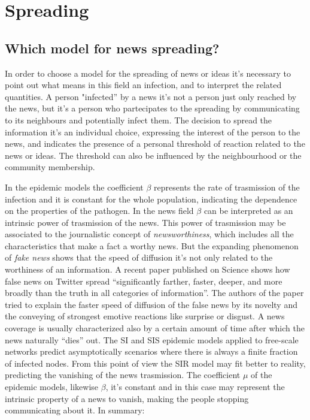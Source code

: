 \chapter{Spreading} %
\label{cha:spreading}

\section{Which model for news spreading?}

In order to choose a model for the spreading of news or ideas it's necessary to point out
what means in this field an infection, and to interpret the related quantities.
A person "infected'' by a news it's not a person just only reached by the news, but it's a person
who partecipates to the spreading by communicating to its neighbours and potentially infect them.
The decision to spread the information it's an individual choice, expressing the interest
of the person to the news, and indicates the presence of a personal threshold of reaction related to the news or ideas.
The threshold can also be influenced by the neighbourhood or the community membership.


In the epidemic models the coefficient $\beta$ represents the rate of trasmission of the infection and it is constant for the whole population, indicating the dependence on the properties of the pathogen.
In the news field $\beta$ can be interpreted as an intrinsic power of trasmission of the news.
This power of trasmission may be associated to the journalistic concept of \textit{newsworthiness},
which includes all the characteristics that make a fact a worthy news.
But the expanding phenomenon of \textit{fake news} shows that the speed of diffusion it's not only related to
the worthiness of an information. A recent paper published on Science \cite{Vosoughi_2018} shows how false news on Twitter spread 
``significantly farther, faster, deeper, and more broadly than the truth in all categories of information''.
The authors of the paper tried to explain the faster speed of diffusion of the false news by its novelty and the conveying
of strongest emotive reactions like surprise or disgust.
A news coverage is usually characterized also by a certain amount of time after which the news naturally ``dies'' out.
The SI and SIS epidemic models applied to free-scale networks predict asymptotically scenarios where there is always a finite 
fraction of infected nodes. From this point of view the SIR model may fit better to reality, predicting the vanishing of the news trasmission.
The coefficient $\mu$ of the epidemic models, likewise $\beta$, it's constant and in this case may represent the intrinsic property of a news to vanish, making the people stopping communicating about it. In summary:

